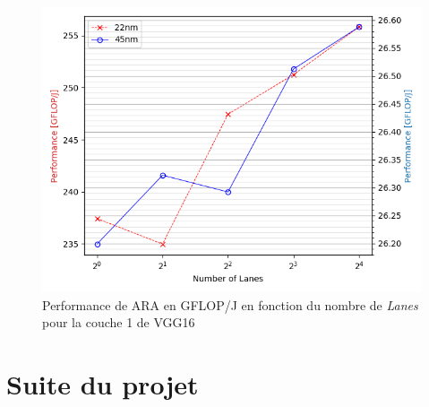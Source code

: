 \documentclass[11pt,letterpaper]{article}
\begin{document}
\begin{multicols}{2}
\begin{figure}[H]
        \includegraphics[width=\linewidth]{performance.png}
        \caption{Performance de ARA en GFLOP/J en fonction du nombre de \textit{Lanes} pour la couche 1 de VGG16}
        \label{fig:performance}
    \end{figure}
    
    \end{multicols}

\pagebreak
\section*{Suite du projet}
\end{document}
